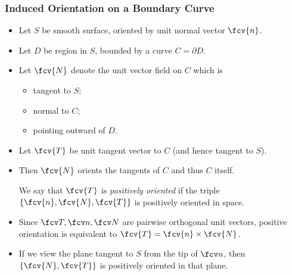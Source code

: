 \begin{frame}
\frametitle{Induced Orientation on a Boundary Curve}
\begin{itemize}
\item Let $S$ be smooth surface, oriented by unit normal vector $\fcv{n}$.
\item Let $D$ be region in $S$, bounded by a curve $C=\partial D$.
\item Let $\fcv{N}$ denote the unit vector field on $C$ which is
\begin{itemize}
\item tangent to $S$;
\item normal to $C$;
\item pointing outward of $D$.
\end{itemize}
\item Let $\fcv{T}$ be unit tangent vector to $C$ (and hence tangent to $S$).
\item Then $\fcv{N}$ orients the tangents of $C$ and thus $C$ itself.
\begin{definition}
We say that $\fcv{T}$ is \emph{positively oriented} if the triple $\{\fcv{n}, \fcv{N}, \fcv{T}\}$ is positively oriented in space.
\end{definition}
\item Since $\fcv T, \fcv n, \fcv N$ are pairwise orthogonal unit vectors, positive orientation is equivalent to $\fcv{T}=\fcv{n}\times \fcv{N}$.
\item If we view the plane tangent to $S$ from the tip of $\fcv n$, then  $\{\fcv{N}, \fcv{T}\}$ is positively oriented in that plane.
\end{itemize}
\end{frame}